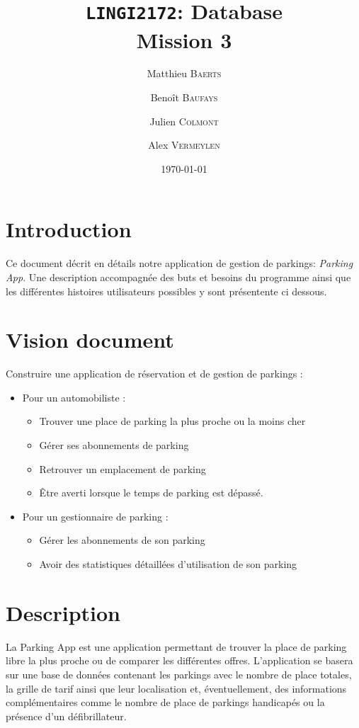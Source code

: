 \documentclass[a4paper,11pt]{article}
\title{\texttt{LINGI2172}: Database\\Mission 3}
\author{Matthieu \textsc{Baerts} \and Benoît \textsc{Baufays} \and Julien \textsc{Colmont} \and Alex \textsc{Vermeylen}}
\date{\today}
\begin{document}
\maketitle

\section*{Introduction}
Ce document décrit en détails notre application de gestion de parkings: \textit{Parking App}. Une description accompagnée des buts et besoins du programme ainsi que les différentes histoires utilisateurs possibles y sont présentente ci dessous.

\section{Vision document}

Construire une application de réservation et de gestion de parkings :
\begin{itemize}
  \item Pour un automobiliste :
  \begin{itemize}
  	\item Trouver une place de parking la plus proche ou la moins cher
    \item Gérer ses abonnements de parking
    \item Retrouver un emplacement de parking
    \item Être averti lorsque le temps de parking est dépassé.
  \end{itemize}
  \item Pour un gestionnaire de parking :
  \begin{itemize}
    \item Gérer les abonnements de son parking
    \item Avoir des statistiques détaillées d'utilisation de son parking
  \end{itemize}
\end{itemize}


\section{Description}

La Parking App est une application permettant de trouver la place de parking libre la plus proche ou de comparer les différentes offres.  L'application se basera sur une base de données contenant les parkings avec le nombre de place totales, la grille de tarif ainsi que leur localisation et, éventuellement, des informations complémentaires comme le nombre de place de parkings handicapés ou la présence d'un défibrillateur.\\
\end{document}
